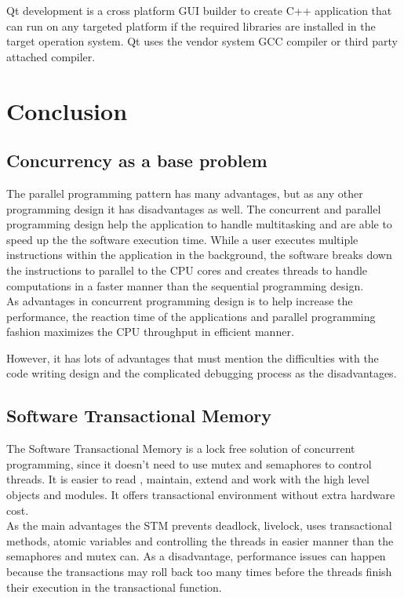 \documentclass[12pt]{article}
\begin{document}
Qt development is a cross platform GUI builder to create C++ application that can run on any targeted platform if the required libraries are installed in the target operation system. Qt uses the vendor system GCC compiler or third party attached compiler.

\clearpage
\section{Conclusion}

\subsection{Concurrency as a base problem}
The parallel programming pattern has many advantages, but as any other programming design it has disadvantages as well. The concurrent and parallel programming design help the application to handle multitasking and are able to speed up the the software execution time. While a user executes multiple instructions within the application in the background, the software breaks down the instructions to parallel to the CPU cores and creates threads to handle computations in a faster manner than the sequential programming design.\\ 

As advantages in concurrent programming design  is to help increase the performance, the reaction time of the applications and parallel programming fashion maximizes the CPU throughput in efficient manner. 

However, it has lots of advantages that must mention the difficulties with the code writing design and the complicated debugging process as the disadvantages.   

\subsection{Software Transactional Memory}
The Software Transactional Memory is a lock free solution of concurrent programming, since it doesn't need to use mutex and semaphores to control threads. It is easier to read , maintain, extend and work with the high level objects and modules. It offers transactional environment without extra hardware cost.\\ 

As the main advantages the STM prevents deadlock, livelock, uses transactional methods, atomic variables and controlling the threads in easier manner than the semaphores and mutex can. As a disadvantage, performance issues can happen because the transactions may roll back too many times before the threads finish their execution in the transactional function.\\
\end{document}

